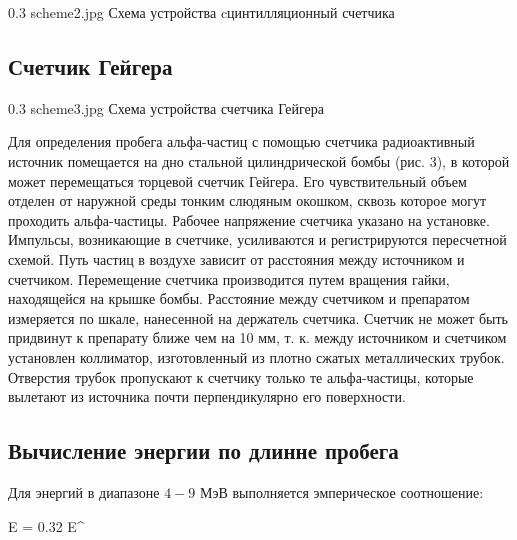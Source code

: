 \pic
{0.3\linewidth}
{scheme2.jpg}
{Схема устройства cцинтилляционный счетчика}

\subsection{Счетчик Гейгера}

\pic
{0.3\linewidth}
{scheme3.jpg}
{Схема устройства счетчика Гейгера}

Для определения пробега альфа-частиц с помощью счетчика радиоактивный источник помещается
на дно стальной цилиндрической бомбы (рис. 3), в которой может перемещаться торцевой
счетчик Гейгера. Его чувствительный объем отделен от наружной среды тонким слюдяным окошком,
сквозь которое могут проходить альфа-частицы. Рабочее напряжение счетчика указано на
установке. \\

Импульсы, возникающие в счетчике, усиливаются и регистрируются пересчетной схемой. Путь
частиц в воздухе зависит от расстояния между источником и счетчиком. Перемещение счетчика
производится путем вращения гайки, находящейся на крышке бомбы. Расстояние между счетчиком
и препаратом измеряется по шкале, нанесенной на держатель счетчика. Счетчик не может быть
придвинут к препарату ближе чем на 10 мм, т. к. между источником и счетчиком установлен
коллиматор, изготовленный из плотно сжатых металлических трубок. Отверстия трубок
пропускают к счетчику только те альфа-частицы, которые вылетают из источника почти
перпендикулярно его поверхности.

\subsection{Вычисление энергии по длинне пробега}

Для энергий в диапазоне $ 4-9 $ МэВ выполняется эмперическое соотношение:

{E = 0.32 \cdot E^{}}

\newpage
